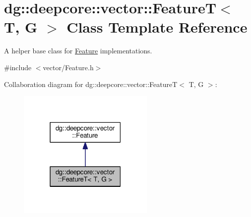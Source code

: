 \hypertarget{structdg_1_1deepcore_1_1vector_1_1_feature_t}{}\section{dg\+:\+:deepcore\+:\+:vector\+:\+:FeatureT$<$ T, G $>$ Class Template Reference}
\label{structdg_1_1deepcore_1_1vector_1_1_feature_t}


A helper base class for \hyperlink{classdg_1_1deepcore_1_1vector_1_1_feature}{Feature} implementations.  




{\ttfamily \#include $<$vector/\+Feature.\+h$>$}



Collaboration diagram for dg\+:\+:deepcore\+:\+:vector\+:\+:FeatureT$<$ T, G $>$\+:
\nopagebreak
\begin{figure}[H]
\begin{center}
\leavevmode
\includegraphics[width=186pt]{structdg_1_1deepcore_1_1vector_1_1_feature_t__coll__graph}
\end{center}
\end{figure}
